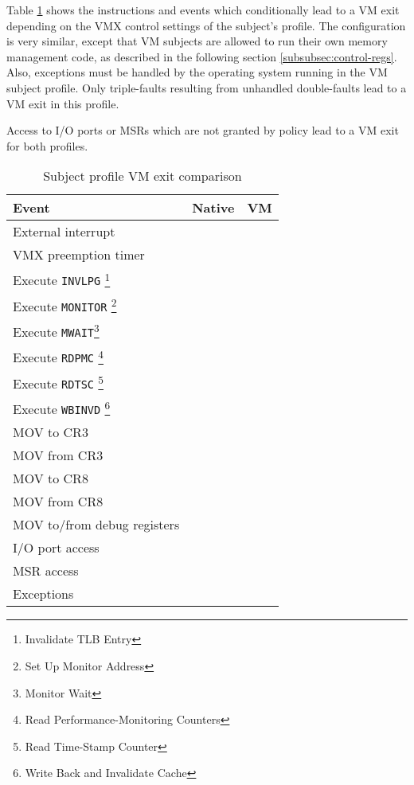 Table \ref{tab:profiles-cond-vm-exits} shows the instructions and events which
conditionally lead to a VM exit depending on the VMX control settings of the
subject's profile. The configuration is very similar, except that VM subjects
are allowed to run their own memory management code, as described in the
following section \ref{subsubsec:control-regs}. Also, exceptions must be handled
by the operating system running in the VM subject profile. Only triple-faults
resulting from unhandled double-faults lead to a VM exit in this profile.

Access to I/O ports or MSRs which are not granted by policy lead to a
VM exit for both profiles.

\begin{table}[h]
	\centering
	\begin{minipage}[c]{8cm}
	\begin{tabular}{l|c|c}
		\textbf{Event} & \textbf{Native} & \textbf{VM} \\
		\hline
		External interrupt   & \checkmark & \checkmark  \\
		VMX preemption timer & \checkmark & \checkmark  \\
		Execute \texttt{INVLPG}
		\footnote{Invalidate TLB Entry}
		& \checkmark & \checkmark \\
		Execute \texttt{MONITOR}
		\footnote{Set Up Monitor Address}
		& \checkmark & \checkmark \\
		Execute \texttt{MWAIT}\footnote{Monitor Wait}
		& \checkmark & \checkmark \\
		Execute \texttt{RDPMC}
		\footnote{Read Performance-Monitoring Counters}
		& \checkmark & \checkmark \\
		Execute \texttt{RDTSC}
		\footnote{Read Time-Stamp Counter}
		& \checkmark & \checkmark \\
		Execute \texttt{WBINVD}
		\footnote{Write Back and Invalidate Cache}
		& \checkmark & \checkmark \\
		MOV to CR3                  & \checkmark & \\
		MOV from CR3                & \checkmark & \\
		MOV to CR8                  & \checkmark & \checkmark \\
		MOV from CR8                & \checkmark & \checkmark \\
		MOV to/from debug registers & \checkmark & \checkmark \\
		\hline
		I/O port access & \checkmark & \checkmark \\
		MSR access      & \checkmark & \checkmark \\
		Exceptions      & \checkmark & \\
		\hline
	\end{tabular}
	\caption{Subject profile VM exit comparison}
	\label{tab:profiles-cond-vm-exits}
	\end{minipage}
\end{table}

